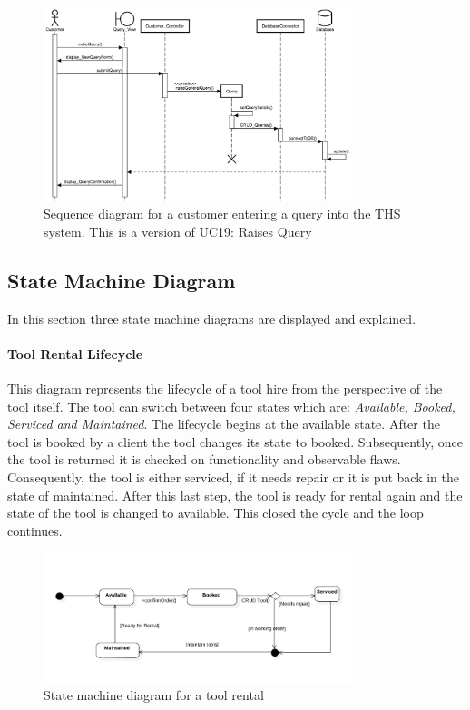 \begin{figure}[H]
      \centering
      \includegraphics[trim = 0 0 0 0, clip, width=0.8\textwidth]{TempImg/make_query_SD.png}
      \caption{Sequence diagram for a customer entering a query into the THS system. This is a version of UC19: Raises Query}
\end{figure}

\hypertarget{state-machine-diagram}{%
\subsection{State Machine Diagram}\label{state-machine-diagram}}

In this section three state machine diagrams are displayed and
explained.

\hypertarget{tool-rental-lifecycle}{%
\paragraph{Tool Rental Lifecycle}\label{tool-rental-lifecycle}}

This diagram represents the lifecycle of a tool hire from the
perspective of the tool itself. The tool can switch between four states
which are: \textit{Available, Booked, Serviced and Maintained}. The
lifecycle begins at the available state. After the tool is booked by a
client the tool changes its state to booked. Subsequently, once the tool
is returned it is checked on functionality and observable flaws.
Consequently, the tool is either serviced, if it needs repair or it is
put back in the state of maintained. After this last step, the tool is
ready for rental again and the state of the tool is changed to
available. This closed the cycle and the loop continues.

\begin{figure}[H]
      \centering
      \includegraphics[trim = 0 0 0 0, clip, width=0.8\textwidth]{TempImg/ToolSM.png}
      \caption{State machine diagram for a tool rental}
\end{figure}

